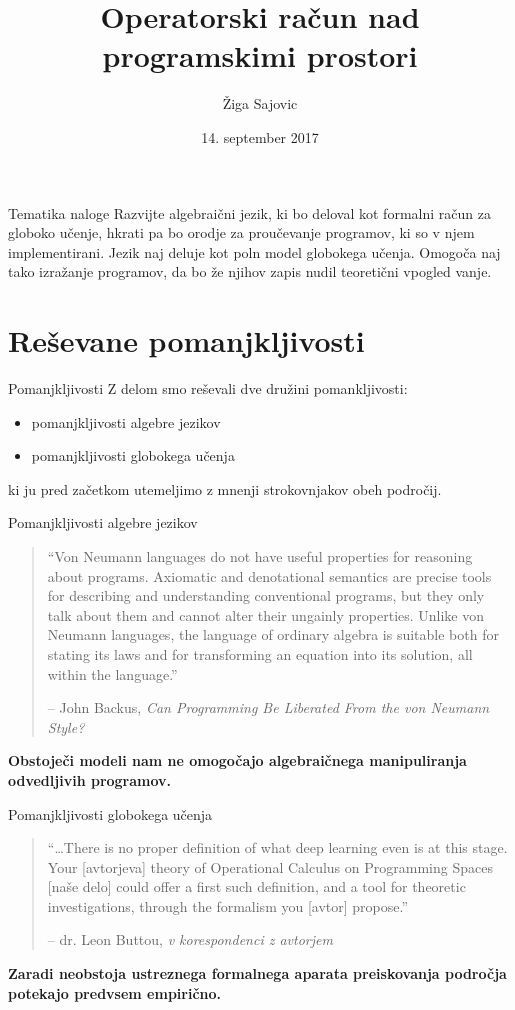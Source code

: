 \documentclass{beamer}
\title{Operatorski račun nad programskimi prostori}
\date{14. september 2017}
\author{Žiga Sajovic}
\institute{Univerza v Ljubljani, Fakulteta za Računlništvo in Informatiko}
\begin{document}
\maketitle

\begin{frame}{Tematika naloge}
Razvijte algebraični jezik, ki bo deloval kot formalni račun za globoko učenje, hkrati pa bo orodje za proučevanje programov, ki so v njem implementirani. Jezik naj deluje kot poln model globokega učenja. Omogoča naj tako izražanje programov, da bo že njihov zapis nudil teoretični vpogled vanje.
\end{frame}
\section{Reševane pomanjkljivosti}

\begin{frame}{Pomanjkljivosti}
Z delom smo reševali dve družini pomankljivosti:
\begin{itemize}
\item
pomanjkljivosti algebre jezikov
\item
pomanjkljivosti globokega učenja
\end{itemize}
ki ju pred začetkom utemeljimo z mnenji strokovnjakov obeh področij.
\end{frame}

\begin{frame}{Pomanjkljivosti algebre jezikov}

\begin{quote}
``Von Neumann languages do not have useful properties for reasoning about programs. Axiomatic and denotational semantics are precise tools for describing and understanding conventional programs, but they only talk about them and cannot alter their ungainly properties. Unlike von Neumann languages, the language of ordinary algebra is suitable both for stating its laws and for transforming an equation into its solution, all within the language.''

-- John Backus, \textit{Can Programming Be Liberated From the von Neumann Style?}
\end{quote}

\textbf{Obstoječi modeli nam ne omogočajo algebraičnega manipuliranja odvedljivih programov.}

\end{frame}

\begin{frame}{Pomanjkljivosti globokega učenja}
\begin{quote}
``\dots There is no proper definition of what deep learning even is at this stage. Your [avtorjeva] theory of Operational Calculus on Programming Spaces [naše delo] could offer a first such definition, and a tool for theoretic investigations, through the formalism you [avtor] propose.''

-- dr. Leon Buttou, \textit{v korespondenci z avtorjem}
\end{quote}

\textbf{Zaradi neobstoja ustreznega formalnega aparata preiskovanja področja potekajo predvsem empirično.}

\end{frame}
\end{document}

